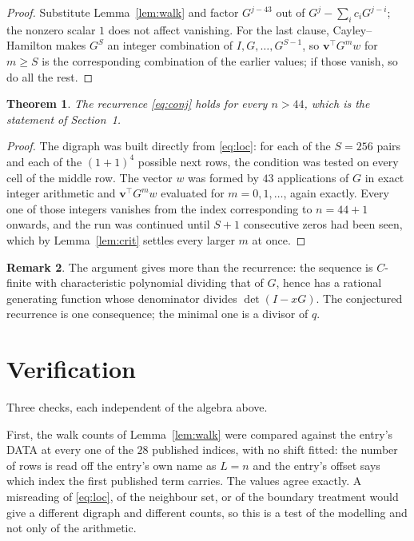 \documentclass[11pt,a4paper]{article}
\theoremstyle{plain}
\newtheorem{theorem}{Theorem}
\theoremstyle{definition}
\newtheorem{remark}[theorem]{Remark}
\begin{document}
\begin{proof}
Substitute Lemma~\ref{lem:walk} and factor $G^{j-43}$ out of
$G^{j}-\sum_ic_iG^{j-i}$; the nonzero scalar $1$ does not affect
vanishing. For the last clause, Cayley--Hamilton makes $G^{S}$ an integer combination of
$I,G,\dots,G^{S-1}$, so $\mathbf{v}^{\!\top}G^{m}w$ for $m\ge S$ is the corresponding
combination of the earlier values; if those vanish, so do all the rest.
\end{proof}

\begin{theorem}
The recurrence \eqref{eq:conj} holds for every $n>44$, which is the statement of
Section~1.
\end{theorem}

\begin{proof}
The digraph was built directly from \eqref{eq:loc}: for each of the $S=256$ pairs and each
of the $(1+1)^{4}$ possible next rows, the condition was tested on every cell of
the middle row. The vector $w$ was formed by $43$ applications of $G$ in exact integer
arithmetic and $\mathbf{v}^{\!\top}G^{m}w$ evaluated for $m=0,1,\dots$, again exactly.
Every one of those integers vanishes from the index corresponding to $n=44+1$ onwards,
and the run was continued until $S+1$ consecutive zeros had been seen, which by
Lemma~\ref{lem:crit} settles every larger $m$ at once.
\end{proof}

\begin{remark}
The argument gives more than the recurrence: the sequence is $C$-finite with characteristic
polynomial dividing that of $G$, hence has a rational generating function whose denominator
divides $\det(I-xG)$. The conjectured recurrence is one consequence; the minimal one is a
divisor of $q$.
\end{remark}

\section{Verification}

Three checks, each independent of the algebra above.

First, the walk counts of Lemma~\ref{lem:walk} were compared against the entry's DATA at
every one of the $28$ published indices, with no shift fitted: the number of rows is
read off the entry's own name as $L=n$ and the entry's offset says which index the first
published term carries. The values agree exactly. A misreading of \eqref{eq:loc}, of the
neighbour set, or of the boundary treatment would give a different digraph and different
counts, so this is a test of the modelling and not only of the arithmetic.
\end{document}

